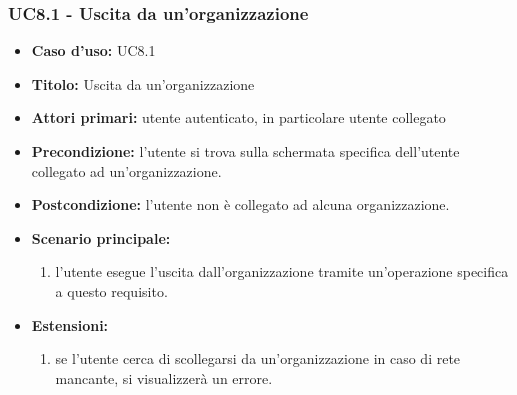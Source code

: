 \documentclass[casi-duso]{subfiles}
\begin{document}
\subsubsection{UC8.1 - Uscita da un'organizzazione}
\label{subsub:uc8.1utente}
\begin{itemize}
  \item \textbf{Caso d’uso:} UC8.1
  \item \textbf{Titolo:} Uscita da un'organizzazione
  \item \textbf{Attori primari:} utente autenticato, in particolare utente collegato
  \item \textbf{Precondizione:} l'utente si trova sulla schermata specifica dell'utente collegato ad un'organizzazione.
  \item \textbf{Postcondizione:} l'utente non è collegato ad alcuna organizzazione.
  \item \textbf{Scenario principale:} 
  \begin{enumerate}
    \item l'utente esegue l'uscita dall'organizzazione tramite un'operazione specifica a questo requisito.
  \end{enumerate}  
  \item \textbf{Estensioni:} 
  \begin{enumerate}
    \item se l'utente cerca di scollegarsi da un'organizzazione in caso di rete mancante, si visualizzerà un errore.
  \end{enumerate}  
\end{itemize}

\end{document}
